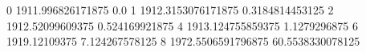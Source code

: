 0 1911.996826171875 0.0
1 1912.3153076171875 0.3184814453125
2 1912.52099609375 0.524169921875
4 1913.124755859375 1.1279296875
6 1919.12109375 7.124267578125
8 1972.5506591796875 60.5538330078125
